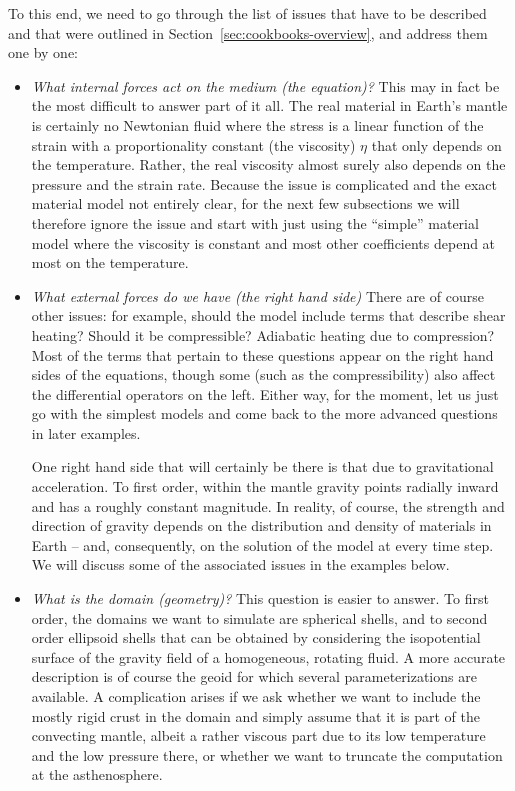 \documentclass{article}
\begin{document}
To this end, we need to go through the list of issues that have to be described
and that were outlined in Section~\ref{sec:cookbooks-overview}, and address them
one by one:
\begin{itemize}
  \item \textit{What internal forces act on the medium (the equation)?}
    This may in fact be the most difficult to answer part of it all. The real
    material in Earth's mantle is certainly no Newtonian fluid where the stress
    is a linear function of the strain with a proportionality constant (the
    viscosity) $\eta$ that only depends on the temperature. Rather, the
    real viscosity almost surely also depends on the pressure and the strain
    rate. Because the issue is complicated and the exact material model not
    entirely clear, for the next few subsections we will therefore ignore the
    issue and start with just using the ``simple'' material model where the
    viscosity is constant and most other coefficients depend at most on the
    temperature.

  \item \textit{What external forces do we have (the right hand side)}
    There are of course other issues: for example, should the model include terms
    that describe shear heating? Should it be compressible? Adiabatic heating due
    to compression? Most of the terms that pertain to these questions appear on
    the right hand sides of the equations, though some (such as the
    compressibility) also affect the differential operators on the left. Either
    way, for the moment, let us just go with the simplest models and come back to
    the more advanced questions in later examples.

    One right hand side that will certainly be there is that due to gravitational
    acceleration. To first order, within the mantle gravity points radially
    inward and has a roughly constant magnitude. In reality, of course, the
    strength and direction of gravity depends on the distribution and density of
    materials in Earth -- and, consequently, on the solution of the model at
    every time step. We will discuss some of the associated issues in the
    examples below.

  \item \textit{What is the domain (geometry)?}
    This question is easier to answer. To first order, the domains we want to
    simulate are spherical shells, and to second order ellipsoid shells that can
    be obtained by considering the isopotential surface of the gravity field of
    a homogeneous, rotating fluid.
    A more accurate description is of course the geoid for which several
    parameterizations are available. A complication arises if we ask whether we
    want to include the mostly rigid crust in the domain and simply assume that
    it is part of the convecting mantle, albeit a rather viscous part due to its
    low temperature and the low pressure there, or whether we want to truncate
    the computation at the asthenosphere.


\end{itemize}
\end{document}
